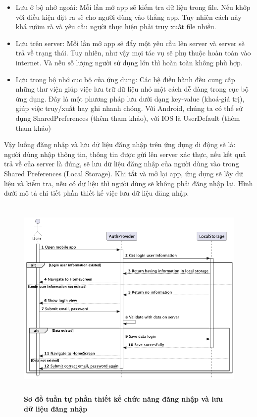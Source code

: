 \begin{itemize}
  \item Lưu ở bộ nhớ ngoài: Mỗi lần mở app sẽ kiểm tra dữ liệu trong file. Nếu khớp với điều kiện đặt ra sẽ cho người dùng vào thẳng app.
  Tuy nhiên cách này khá rườm rà và yêu cầu người thực hiện phải truy xuất file nhiều.
  \item Lưu trên server: Mỗi lần mở app sẽ đẩy một yêu cầu lên server và server sẽ trả về trạng thái. Tuy nhiên, như vậy mọi tác
  vụ sẽ phụ thuộc hoàn toàn vào internet. Và nếu số lượng người sử dụng lớn thì hoàn toàn không phù hợp.
  \item Lưu trong bộ nhớ cục bộ của ứng dụng: Các hệ điều hành đều cung cấp những thư viện giúp việc lưu trữ dữ liệu nhỏ một cách 
  dễ dàng trong cục bộ ứng dụng. Đây là một phương pháp lưu dưới dạng key-value (khoá-giá trị), giúp việc truy/xuất hay ghi nhanh chóng.
  Với Android, chúng ta có thể sử dụng SharedPreferences (thêm tham khảo), với IOS là UserDefault (thêm tham khảo)

\end{itemize}
Vậy luồng đăng nhập và lưu dữ liệu đăng nhập trên ứng dụng di động sẽ là: người dùng nhập thông tin, thông tin được gửi lên server xác thực,
nếu kết quả trả về của server là đúng, sẽ lưu dữ liệu đăng nhập của người dùng vào trong Shared Preferences (Local Storage). Khi tắt và mở lại app,
ứng dụng sẽ lấy dữ liệu và kiểm tra, nếu có dữ liệu thì người dùng sẽ không phải đăng nhập lại. Hình dưới mô tả chi tiết phần thiết
kế việc lưu dữ liệu đăng nhập.

\begin{figure}[H]
  \centering
  \includegraphics[width=16cm,height=10cm]{Images/mobile_app/design_store_data_login.png}
  \caption[Sơ đồ tuần tự phần thiết kế chức năng đăng nhập và lưu dữ liệu đăng nhập]{\bfseries \fontsize{12pt}{0pt}
  \selectfont Sơ đồ tuần tự phần thiết kế chức năng đăng nhập và lưu dữ liệu đăng nhập}
  \label{seq_auth} %
\end{figure}

